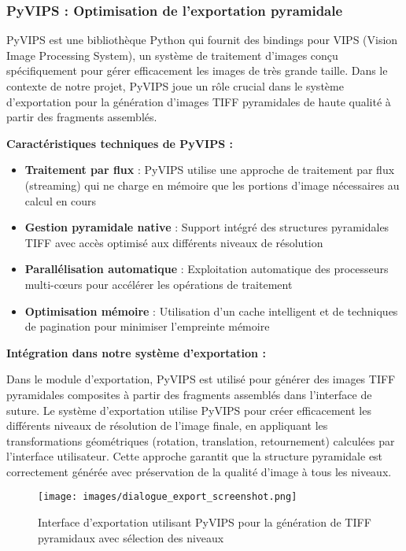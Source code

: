 \subsubsection{PyVIPS : Optimisation de l'exportation pyramidale}

PyVIPS est une bibliothèque Python qui fournit des bindings pour VIPS (Vision Image Processing System), un système de traitement d'images conçu spécifiquement pour gérer efficacement les images de très grande taille. Dans le contexte de notre projet, PyVIPS joue un rôle crucial dans le système d'exportation pour la génération d'images TIFF pyramidales de haute qualité à partir des fragments assemblés.

\textbf{Caractéristiques techniques de PyVIPS :}

\begin{itemize}[leftmargin=*]
    \item \textbf{Traitement par flux} : PyVIPS utilise une approche de traitement par flux (streaming) qui ne charge en mémoire que les portions d'image nécessaires au calcul en cours
    \item \textbf{Gestion pyramidale native} : Support intégré des structures pyramidales TIFF avec accès optimisé aux différents niveaux de résolution
    \item \textbf{Parallélisation automatique} : Exploitation automatique des processeurs multi-cœurs pour accélérer les opérations de traitement
    \item \textbf{Optimisation mémoire} : Utilisation d'un cache intelligent et de techniques de pagination pour minimiser l'empreinte mémoire
\end{itemize}

\textbf{Intégration dans notre système d'exportation :}

Dans le module d'exportation, PyVIPS est utilisé pour générer des images TIFF pyramidales composites à partir des fragments assemblés dans l'interface de suture. Le système d'exportation utilise PyVIPS pour créer efficacement les différents niveaux de résolution de l'image finale, en appliquant les transformations géométriques (rotation, translation, retournement) calculées par l'interface utilisateur. Cette approche garantit que la structure pyramidale est correctement générée avec préservation de la qualité d'image à tous les niveaux.

\begin{figure}[H]
\centering
\texttt{[image: images/dialogue\_export\_screenshot.png]}
\caption{Interface d'exportation utilisant PyVIPS pour la génération de TIFF pyramidaux avec sélection des niveaux}
\label{fig:pyvips_export}
\end{figure}

